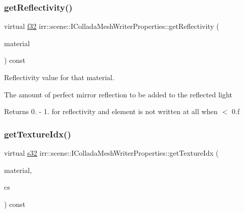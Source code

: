 \subsubsection{\texorpdfstring{get\+Reflectivity()}{getReflectivity()}\hspace{0.1cm}{\footnotesize\ttfamily [2/2]}}
{\footnotesize\ttfamily virtual \hyperlink{namespaceirr_a0277be98d67dc26ff93b1a6a1d086b07}{f32} irr\+::scene\+::\+I\+Collada\+Mesh\+Writer\+Properties\+::get\+Reflectivity (\begin{DoxyParamCaption}\item[{const \hyperlink{classirr_1_1video_1_1SMaterial}{video\+::\+S\+Material} \&}]{material }\end{DoxyParamCaption}) const\hspace{0.3cm}{\ttfamily [pure virtual]}}



Reflectivity value for that material. 

The amount of perfect mirror reflection to be added to the reflected light \begin{DoxyReturn}{Returns}
0. -\/ 1. for reflectivity and element is not written at all when $<$ 0.\+f 
\end{DoxyReturn}
\mbox{\label{classirr_1_1scene_1_1IColladaMeshWriterProperties_a171287213537036be889a36ae4896c0e}} 
\subsubsection{\texorpdfstring{get\+Texture\+Idx()}{getTextureIdx()}\hspace{0.1cm}{\footnotesize\ttfamily [1/2]}}
{\footnotesize\ttfamily virtual \hyperlink{namespaceirr_ac66849b7a6ed16e30ebede579f9b47c6}{s32} irr\+::scene\+::\+I\+Collada\+Mesh\+Writer\+Properties\+::get\+Texture\+Idx (\begin{DoxyParamCaption}\item[{const \hyperlink{classirr_1_1video_1_1SMaterial}{video\+::\+S\+Material} \&}]{material,  }\item[{\hyperlink{namespaceirr_1_1scene_a6204218341c6b449d879cd8367b2f8d8}{E\+\_\+\+C\+O\+L\+L\+A\+D\+A\+\_\+\+C\+O\+L\+O\+R\+\_\+\+S\+A\+M\+P\+L\+ER}}]{cs }\end{DoxyParamCaption}) const\hspace{0.3cm}{\ttfamily [pure virtual]}}




